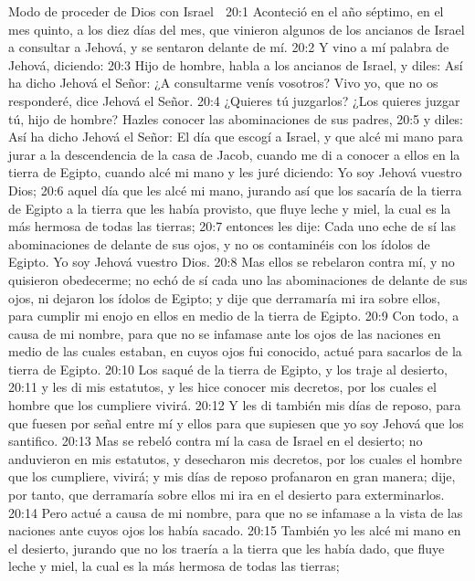 Modo de proceder de Dios con Israel  

20:1 Aconteció en el año séptimo, en el mes quinto, a los diez días del mes, que vinieron algunos de los ancianos de Israel a consultar a Jehová, y se sentaron delante de mí.  
20:2 Y vino a mí palabra de Jehová, diciendo:  
20:3 Hijo de hombre, habla a los ancianos de Israel, y diles: Así ha dicho Jehová el Señor: ¿A consultarme venís vosotros? Vivo yo, que no os responderé, dice Jehová el Señor.  
20:4 ¿Quieres tú juzgarlos? ¿Los quieres juzgar tú, hijo de hombre? Hazles conocer las abominaciones de sus padres, 
20:5 y diles: Así ha dicho Jehová el Señor: El día que escogí a Israel, y que alcé mi mano para jurar a la descendencia de la casa de Jacob, cuando me di a conocer a ellos en la tierra de Egipto, cuando alcé mi mano y les juré diciendo: Yo soy Jehová vuestro Dios;  
20:6 aquel día que les alcé mi mano, jurando así que los sacaría de la tierra de Egipto a la tierra que les había provisto, que fluye leche y miel, la cual es la más hermosa de todas las tierras; 
20:7 entonces les dije: Cada uno eche de sí las abominaciones de delante de sus ojos, y no os contaminéis con los ídolos de Egipto. Yo soy Jehová vuestro Dios.  
20:8 Mas ellos se rebelaron contra mí, y no quisieron obedecerme; no echó de sí cada uno las abominaciones de delante de sus ojos, ni dejaron los ídolos de Egipto; y dije que derramaría mi ira sobre ellos, para cumplir mi enojo en ellos en medio de la tierra de Egipto.  
20:9 Con todo, a causa de mi nombre, para que no se infamase ante los ojos de las naciones en medio de las cuales estaban, en cuyos ojos fui conocido, actué para sacarlos de la tierra de Egipto.  
20:10 Los saqué de la tierra de Egipto, y los traje al desierto,  
20:11 y les di mis estatutos, y les hice conocer mis decretos, por los cuales el hombre que los cumpliere vivirá.  
20:12 Y les di también mis días de reposo, para que fuesen por señal entre mí y ellos para que supiesen que yo soy Jehová que los santifico.  
20:13 Mas se rebeló contra mí la casa de Israel en el desierto; no anduvieron en mis estatutos, y desecharon mis decretos, por los cuales el hombre que los cumpliere, vivirá; y mis días de reposo profanaron en gran manera; dije, por tanto, que derramaría sobre ellos mi ira en el desierto para exterminarlos.  
20:14 Pero actué a causa de mi nombre, para que no se infamase a la vista de las naciones ante cuyos ojos los había sacado.  
20:15 También yo les alcé mi mano en el desierto, jurando que no los traería a la tierra que les había dado, que fluye leche y miel, la cual es la más hermosa de todas las tierras;  
